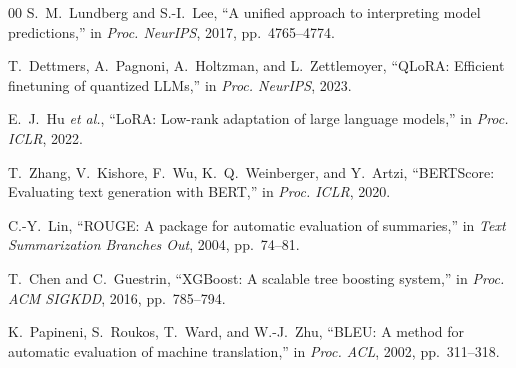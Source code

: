 \documentclass[preprint,12pt]{elsarticle}
\begin{document}
\begin{thebibliography}{00}
 S.~M.~Lundberg and S.-I.~Lee, ``A unified approach to interpreting model predictions,'' in \textit{Proc. NeurIPS}, 2017, pp.~4765--4774.

 T.~Dettmers, A.~Pagnoni, A.~Holtzman, and L.~Zettlemoyer, ``QLoRA: Efficient finetuning of quantized LLMs,'' in \textit{Proc. NeurIPS}, 2023.

 E.~J.~Hu \textit{et al.}, ``LoRA: Low-rank adaptation of large language models,'' in \textit{Proc. ICLR}, 2022.

 T.~Zhang, V.~Kishore, F.~Wu, K.~Q.~Weinberger, and Y.~Artzi, ``BERTScore: Evaluating text generation with BERT,'' in \textit{Proc. ICLR}, 2020.

 C.-Y.~Lin, ``ROUGE: A package for automatic evaluation of summaries,'' in \textit{Text Summarization Branches Out}, 2004, pp.~74--81.

 T.~Chen and C.~Guestrin, ``XGBoost: A scalable tree boosting system,'' in \textit{Proc. ACM SIGKDD}, 2016, pp.~785--794.

 K.~Papineni, S.~Roukos, T.~Ward, and W.-J.~Zhu, ``BLEU: A method for automatic evaluation of machine translation,'' in \textit{Proc. ACL}, 2002, pp.~311--318.

\end{thebibliography}
\end{document}
